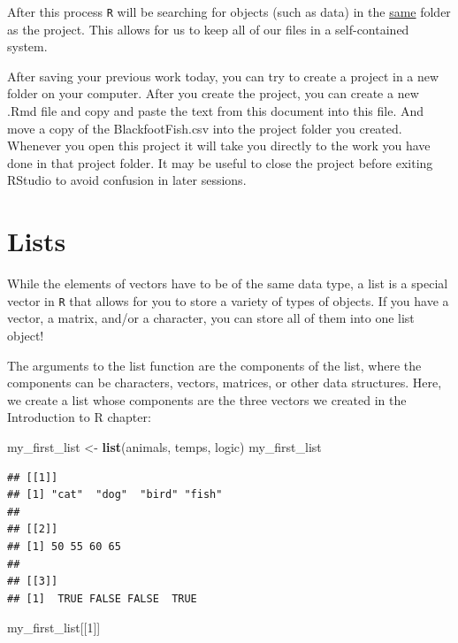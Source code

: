 \documentclass[
  10pt,
  letterpaper,
  twoside,
  openright]{book}
\newenvironment{Shaded}{\begin{snugshade}}{\end{snugshade}}
\newcommand{\DecValTok}[1]{\textcolor[rgb]{0.00,0.00,0.81}{#1}}
\newcommand{\FunctionTok}[1]{\textcolor[rgb]{0.13,0.29,0.53}{\textbf{#1}}}
\newcommand{\NormalTok}[1]{#1}
\newcommand{\OtherTok}[1]{\textcolor[rgb]{0.56,0.35,0.01}{#1}}
\begin{document}
After this process \texttt{R} will be searching for objects (such as
data) in the \underline{same} folder as the project. This allows for us
to keep all of our files in a self-contained system.

After saving your previous work today, you can try to create a project
in a new folder on your computer. After you create the project, you can
create a new .Rmd file and copy and paste the text from this document
into this file. And move a copy of the BlackfootFish.csv into the
project folder you created. Whenever you open this project it will take
you directly to the work you have done in that project folder. It may be
useful to close the project before exiting RStudio to avoid confusion in
later sessions.

\hypertarget{lists}{%
\section{Lists}\label{lists}}

While the elements of vectors have to be of the same data type, a list
is a special vector in \texttt{R} that allows for you to store a variety
of types of objects. If you have a vector, a matrix, and/or a character,
you can store all of them into one list object!

The arguments to the list function are the components of the list, where
the components can be characters, vectors, matrices, or other data
structures. Here, we create a list whose components are the three
vectors we created in the Introduction to R chapter:

\begin{Shaded}
\begin{Highlighting}[]
\NormalTok{my\_first\_list }\OtherTok{\textless{}{-}} \FunctionTok{list}\NormalTok{(animals, temps, logic)}
\NormalTok{my\_first\_list}
\end{Highlighting}
\end{Shaded}

\begin{verbatim}
## [[1]]
## [1] "cat"  "dog"  "bird" "fish"
## 
## [[2]]
## [1] 50 55 60 65
## 
## [[3]]
## [1]  TRUE FALSE FALSE  TRUE
\end{verbatim}

\begin{Shaded}
\begin{Highlighting}[]
\NormalTok{my\_first\_list[[}\DecValTok{1}\NormalTok{]]}
\end{Highlighting}
\end{Shaded}
\end{document}
